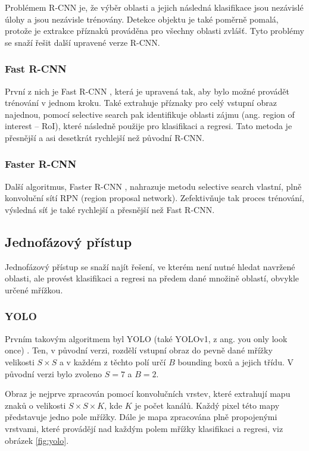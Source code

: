 Problémem R-CNN je, že výběr oblasti a jejich následná klasifikace jsou
nezávislé úlohy a jsou nezávisle trénovány. Detekce objektu je také poměrně
pomalá, protože je extrakce příznaků prováděna pro všechny oblasti zvlášť. Tyto
problémy se snaží řešit další upravené verze R-CNN.

\subsubsection*{Fast R-CNN}
První z nich je Fast R-CNN \cite{fast-r-cnn}, která je upravená tak, aby bylo
možné provádět trénování v jednom kroku. Také extrahuje příznaky pro celý
vstupní obraz najednou, pomocí selective search pak identifikuje oblasti zájmu
(ang. region of interest – RoI), které následně použije pro klasifikaci a
regresi. Tato metoda je přesnější a asi desetkrát rychlejší než původní R-CNN.

\subsubsection*{Faster R-CNN}
Další algoritmus, Faster R-CNN \cite{faster-r-cnn}, nahrazuje metodu selective
search vlastní, plně konvoluční sítí RPN (region proposal network).
Zefektivňuje tak proces trénování, výsledná síť je také rychlejší a přesnější
než Fast R-CNN.

\subsection{Jednofázový přístup}

Jednofázový přístup se snaží najít řešení, ve kterém není nutné hledat navržené
oblasti, ale provést klasifikaci a regresi na předem dané množině oblastí,
obvykle určené mřížkou.

\subsubsection*{YOLO}
Prvním takovým algoritmem byl YOLO (také YOLOv1, z ang. you only look once)
\cite{yolo}. Ten, v původní verzi, rozdělí vstupní obraz do pevně dané mřížky
velikosti $S \times S$ a v každém z těchto polí určí $B$ bounding boxů a jejich
třídu. V původní verzi bylo zvoleno $S = 7$ a $B = 2$.

Obraz je nejprve zpracován pomocí konvolučních vrstev, které extrahují mapu
znaků o velikosti $S \times S \times K$, kde $K$ je počet kanálů. Každý pixel
této mapy představuje jedno pole mřížky. Dále je mapa zpracována plně
propojenými vrstvami, které provádějí nad každým polem mřížky klasifikaci a
regresi, viz obrázek \ref{fig:yolo}.

